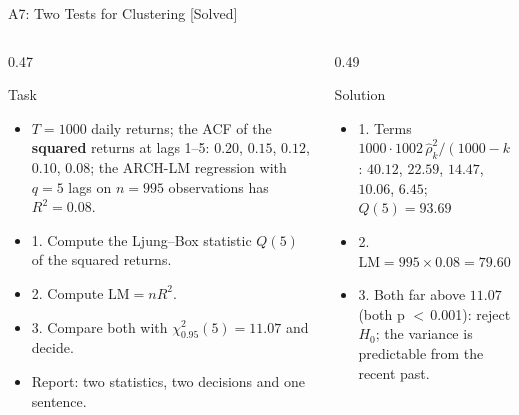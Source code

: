 \begin{frame}{A7: Two Tests for Clustering [Solved]}
\itemsize{\scriptsize}
\begin{columns}[T]
\begin{column}{0.47\textwidth}
\begin{block}{Task}
\begin{itemize}
    \item $T = 1000$ daily returns; the ACF of the \textbf{squared} returns at lags 1--5: $0.20$, $0.15$, $0.12$, $0.10$, $0.08$; the ARCH-LM regression with $q = 5$ lags on $n = 995$ observations has $R^2 = 0.08$.
    \item 1. Compute the Ljung--Box statistic $Q(5)$ of the squared returns.
    \item 2. Compute $\mathrm{LM} = nR^2$.
    \item 3. Compare both with $\chi^2_{0.95}(5) = 11.07$ and decide.
    \item Report: two statistics, two decisions and one sentence.
\end{itemize}
\end{block}
\end{column}
\begin{column}{0.49\textwidth}
\begin{exampleblock}{Solution}
\begin{itemize}
    \item 1. Terms $1000 \cdot 1002\,\hat\rho_k^2/(1000 - k)$: $40.12$, $22.59$, $14.47$, $10.06$, $6.45$; $Q(5) = 93.69$
    \item 2. $\mathrm{LM} = 995 \times 0.08 = 79.60$
    \item 3. Both far above $11.07$ (both p $<$\,0.001): reject $H_0$; the variance is predictable from the recent past.
\end{itemize}
\end{exampleblock}
\end{column}
\end{columns}
\end{frame}

